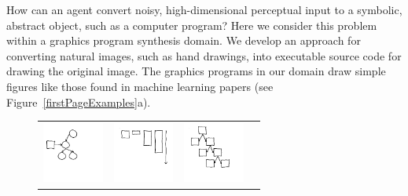 \documentclass{article}
\newcommand{\exampleImageSize}{2cm}
\begin{document}
 How can an agent convert noisy, high-dimensional perceptual input
 to a symbolic, abstract object, such as a computer program?  Here we
 consider this problem within a graphics program synthesis domain.  We
 develop an approach for converting natural images, such as hand
 drawings, into executable source code for drawing the original image.
 The graphics programs in our domain draw simple figures like those found in
 machine learning papers (see Figure~\ref{firstPageExamples}a).
 \begin{figure}[H]\vspace{-0.7cm}
  \begin{minipage}[t]{0.7\linewidth}  
\begin{tabular}{llll}
  \includegraphics[width = \exampleImageSize]{figures/expert-60.png}&
  \includegraphics[width = \exampleImageSize]{figures/expert-5.png}&
    \includegraphics[width = \exampleImageSize]{figures/expert-17.png}&

\end{tabular}
\end{minipage}
\end{figure}
\end{document}
